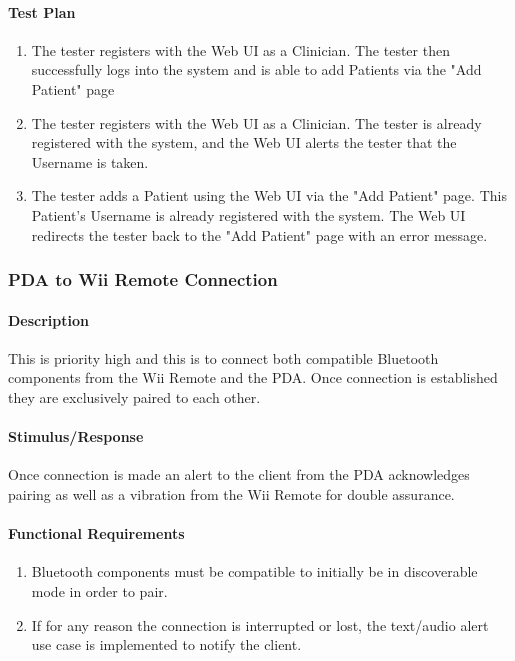 \documentclass{article}
\begin{document}
\paragraph{Test Plan}
\begin{enumerate}
\item The tester registers with the Web UI as a Clinician. The tester then successfully logs into the system and is able to add Patients via the "Add Patient" page
\item The tester registers with the Web UI as a Clinician. The tester is already registered with the system, and the Web UI alerts the tester that the Username is taken.
\item The tester adds a Patient using the Web UI via the "Add Patient" page. This Patient's Username is already registered with the system. The Web UI redirects the tester
back to the "Add Patient" page with an error message.
\end{enumerate}

\subsubsection {PDA to Wii Remote Connection}\label{sec: PDA Wii Conn}
\paragraph {Description}
This is priority high and this is to connect both compatible Bluetooth components from the Wii Remote and the PDA.  Once connection is established they are exclusively paired to each other.

\paragraph {Stimulus/Response}
Once connection is made an alert to the client from the PDA acknowledges pairing as well as a vibration from the Wii Remote for double assurance.

\paragraph {Functional Requirements}
\begin{enumerate}
\item Bluetooth components must be compatible to initially be in discoverable mode in order to pair.
\item If for any reason the connection is interrupted or lost, the text/audio alert use case is implemented to notify the client. 
\end{enumerate}
\end{document}
